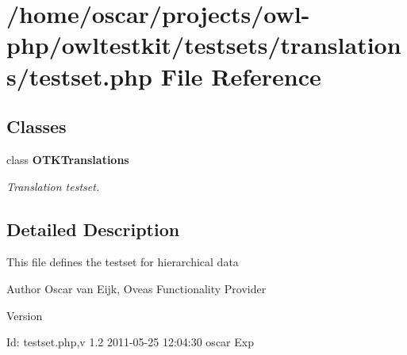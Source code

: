 \section{/home/oscar/projects/owl-\/php/owltestkit/testsets/translations/testset.php File Reference}
\label{translations_2testset_8php}
\subsection*{Classes}
\begin{DoxyCompactItemize}
\item 
class {\bf OTKTranslations}
\begin{DoxyCompactList}\small\item\em Translation testset. \end{DoxyCompactList}\end{DoxyCompactItemize}


\subsection{Detailed Description}
This file defines the testset for hierarchical data \begin{DoxyAuthor}{Author}
Oscar van Eijk, Oveas Functionality Provider 
\end{DoxyAuthor}
\begin{DoxyVersion}{Version}

\end{DoxyVersion}
\begin{DoxyParagraph}{Id:}
testset.php,v 1.2 2011-\/05-\/25 12:04:30 oscar Exp 
\end{DoxyParagraph}
